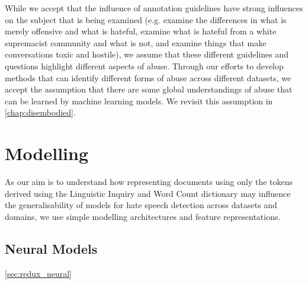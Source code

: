 While we accept that the influence of annotation guidelines have strong influences on the subject that is being examined (e.g. \citet{Davidson:2017} examine the differences in what is merely offensive and what is hateful, \citet{Garcia:2019} examine what is hateful from a white supremacist community and what is not, and \citet{Wulczyn:2017} examine things that make conversations toxic and hostile), we assume that these different guidelines and questions highlight different aspects of abuse. Through our efforts to develop methods that can identify different forms of abuse across different datasets, we accept the assumption that there are some global understandings of abuse that can be learned by machine learning models. We revisit this assumption in \autoref{chap:disembodied}.

\section{Modelling}

As our aim is to understand how representing documents using only the tokens derived using the Linguistic Inquiry and Word Count dictionary may influence the generalisability of models for hate speech detection across datasets and domains, we use simple modelling architectures and feature representations.

\subsection{Neural Models}\ref{sec:redux_neural}

